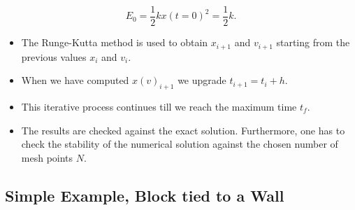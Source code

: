 \documentclass[%
oneside,                 %
final,                   %
10pt]{article}
\begin{document}
\noindent
  \[
    E_0=\frac{1}{2}kx(t=0)^2=\frac{1}{2}k.
  \]
\begin{itemize}
 \item The Runge-Kutta method is used to obtain $x_{i+1}$ and $v_{i+1}$ starting from the previous values $x_i$ and $v_i$.

 \item When we have computed $x(v)_{i+1}$ we upgrade  $t_{i+1}=t_i+h$.

 \item This iterative  process continues till we reach the maximum time $t_f$.

 \item The results are checked against the exact solution. Furthermore, one has to check the stability of the numerical solution against the chosen number of mesh points $N$.      
\end{itemize}

\noindent



\subsection*{Simple Example, Block tied to a Wall}

\end{document}
